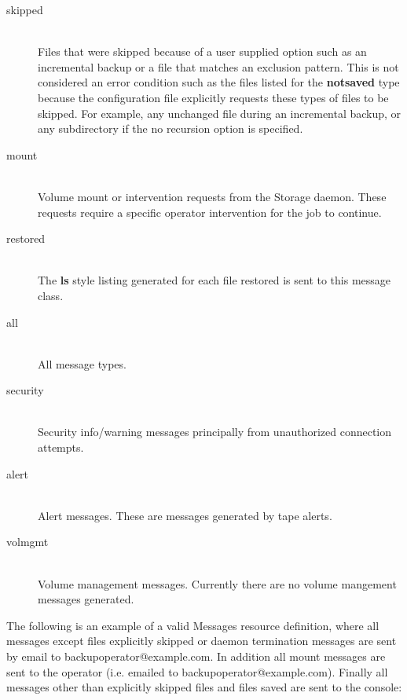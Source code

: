 \begin{description}
\begin{description}
\item [skipped] \hfill \\
Files that were skipped because of a user supplied option such as an
incremental backup or a file that matches an exclusion pattern.  This is
not considered an error condition such as the files listed for the {\bf
notsaved} type because the configuration file explicitly requests these
types of files to be skipped.  For example, any unchanged file during an
incremental backup, or any subdirectory if the no recursion option is
specified.

\item [mount] \hfill \\
Volume mount or intervention requests from the Storage daemon.  These
requests require a specific operator intervention for the job to
continue.

\item [restored] \hfill \\
The {\bf ls} style listing generated for each file restored is sent to
this message class.

\item [all] \hfill \\
All message types.

\item [security] \hfill \\
Security info/warning messages principally from unauthorized
connection attempts.

\item [alert] \hfill \\
Alert messages. These are messages generated by tape alerts.

\item [volmgmt] \hfill \\
Volume management messages. Currently there are no volume mangement
messages generated.
\end{description}

\end{description}

The following is an example of a valid Messages resource definition, where
all messages except files explicitly skipped or daemon termination messages
are sent by email to backupoperator@example.com.  In addition all mount messages
are sent to the operator (i.e.  emailed to backupoperator@example.com).  Finally
all messages other than explicitly skipped files and files saved are sent
to the console:

